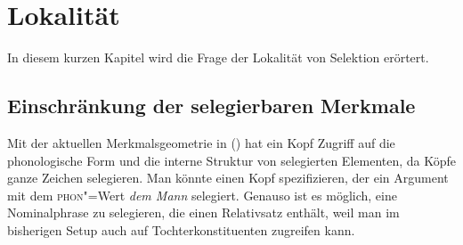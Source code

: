 
\chapter{Lokalität}
\label{Kapitel-Lokalität}


In diesem kurzen Kapitel wird die Frage der Lokalität von Selektion erörtert.

\section{Einschränkung der selegierbaren Merkmale}
\label{sec-synsem}

Mit der aktuellen Merkmalsgeometrie in () hat ein Kopf Zugriff auf die phonologische Form und 
die interne Struktur von selegierten Elementen, da Köpfe ganze Zeichen selegieren.
\ea
{}
\z
Man könnte \zb einen Kopf spezifizieren, der ein Argument mit dem \textsc{phon}"=Wert {\em dem Mann\/} selegiert. Genauso ist es möglich,
eine Nominalphrase zu selegieren, die einen Relativsatz enthält, weil man im
bisherigen Setup auch auf Tochterkonstituenten zugreifen kann.

